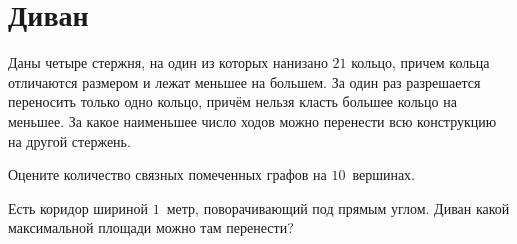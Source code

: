 
\section*{Диван}


\begin{problems}

\item
Даны четыре стержня, на один из которых нанизано $21$ кольцо, причем кольца
отличаются размером и лежат меньшее на большем.
За один раз разрешается переносить только одно кольцо, причём нельзя класть
большее кольцо на меньшее.
За какое наименьшее число ходов можно перенести всю конструкцию на другой
стержень.

\item
Оцените количество связных помеченных графов на $10$~вершинах.

\item
Есть коридор шириной $1$~метр, поворачивающий под прямым углом.
Диван какой максимальной площади можно там перенести?

\end{problems}

